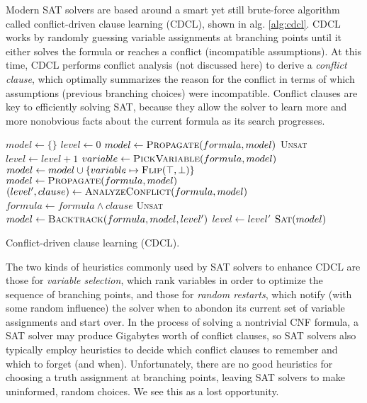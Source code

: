 \documentclass{article}
\begin{document}
Modern SAT solvers are based around a smart yet still brute-force algorithm
called conflict-driven clause learning (CDCL), shown in alg. \ref{alg:cdcl}.
CDCL works by randomly guessing variable assignments at branching points until
it either solves the formula or reaches a conflict (incompatible assumptions).
At this time, CDCL performs conflict analysis (not discussed here) to derive a
\emph{conflict clause}, which optimally summarizes the reason for the conflict
in terms of which assumptions (previous branching choices) were incompatible.
Conflict clauses are key to efficiently solving SAT, because they allow the
solver to learn more and more nonobvious facts about the current formula as its
search progresses.

\begin{algorithm}
\begin{algorithmic}[1]
  \State $model \gets \{ \}$ 
  \State $level \gets 0$ 
  \State $model \gets \textsc{Propagate}(formula, model)$ 
    \State \Return \textsc{Unsat} 
  \EndIf
   
    \State $level \gets level + 1$
    \State $variable \gets \textsc{PickVariable}(formula, model)$ 
    \State $model \gets model \cup \{ variable \mapsto \textsc{Flip}(\top, \bot) \}$ 
    \State $model \gets \textsc{Propagate}(formula, model)$ 
      \State $(level', clause) \gets \textsc{AnalyzeConflict}(formula, model)$
      \State $formula \gets formula \wedge clause$
        \State \Return \textsc{Unsat} 
      \Else
        \State $model \gets \textsc{Backtrack}(formula, model, level')$
        \State $level \gets level'$
      \EndIf
    \EndWhile
  \EndWhile
  \State \Return $\textsc{Sat}(model)$
\EndProcedure
\end{algorithmic}
\caption{Conflict-driven clause learning (CDCL).}\label{alg:cdcl}
\end{algorithm}

The two kinds of heuristics commonly used by SAT solvers to enhance CDCL are
those for \emph{variable selection}, which rank variables in order to optimize
the sequence of branching points, and those for \emph{random restarts}, which
notify (with some random influence) the solver when to abondon its current
set of variable assignments and start over. In the process of solving a
nontrivial CNF formula, a SAT solver may produce Gigabytes worth of conflict
clauses, so SAT solvers also typically employ heuristics to decide which
conflict clauses to remember and which to forget (and when). Unfortunately,
there are no good heuristics for choosing a truth assignment at branching points,
leaving SAT solvers to make uninformed, random choices. We see this as a lost
opportunity.
\end{document}
